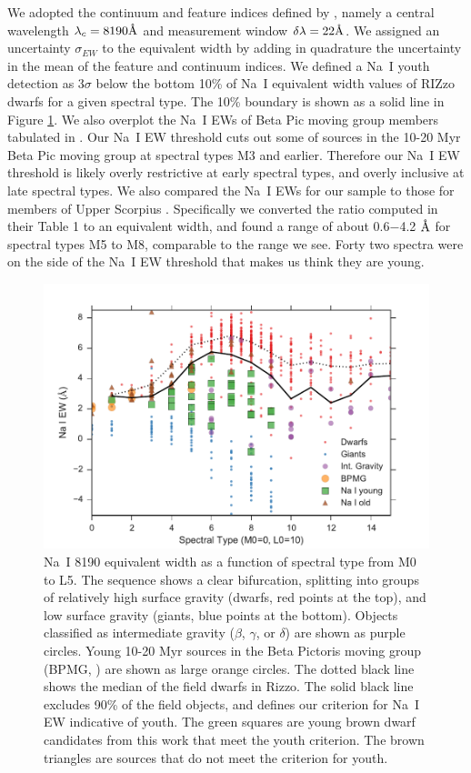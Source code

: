 \documentclass[12pt,preprint]{aastex}
\newcommand{\angstrom}{\mbox{\normalfont\AA}}
\begin{document}
We adopted the continuum and feature indices defined by \citet{2012AJ....143..114S}, namely a central wavelength $\lambda_c= 8190 \angstrom$ and measurement window $\delta \lambda = 22 \angstrom$.  We assigned an uncertainty $\sigma_{EW}$ to the equivalent width by adding in quadrature the uncertainty in the mean of the feature and continuum indices.  We defined a Na~I youth detection as 3$\sigma$ below the bottom 10\% of Na~I equivalent width values of RIZzo dwarfs for a given spectral type.  The 10\% boundary is shown as a solid line in Figure \ref{fig_NaI_EW}.  We also overplot the Na~I EWs of Beta Pic moving group members tabulated in \citet{2012AJ....143..114S}.  Our Na~I EW threshold cuts out some of sources in the 10-20 Myr Beta Pic moving group \citep{2012AJ....143..114S} at spectral types M3 and earlier.  Therefore our Na~I EW threshold is likely overly restrictive at early spectral types, and overly inclusive at late spectral types.  We also compared the Na~I EWs for our sample to those for members of Upper Scorpius \citep{2006AJ....131.3016S}.  Specifically we converted the ratio computed in their Table 1 to an equivalent width, and found a range of about 0.6$-$4.2 $\angstrom$ for spectral types M5 to M8, comparable to the range we see.  Forty two spectra were on the side of the Na~I EW threshold that makes us think they are young.

\begin{figure}[ht!]
  \caption{Na~I 8190 equivalent width as a function of spectral type from M0 to L5.  The sequence shows a clear bifurcation, splitting into groups of relatively high surface gravity (dwarfs, red points at the top), and low surface gravity (giants, blue points at the bottom).  Objects classified as intermediate gravity ($\beta$, $\gamma$, or $\delta$) are shown as purple circles.  Young 10-20 Myr sources in the Beta Pictoris moving group (BPMG, \citet{2012AJ....143..114S}) are shown as large orange circles.  The dotted black line shows the median of the field dwarfs in Rizzo.  The solid black line excludes 90\% of the field objects, and defines our criterion for Na~I EW indicative of youth.  The green squares are young brown dwarf candidates from this work that meet the youth criterion.  The brown triangles are sources that do not meet the criterion for youth.\label{fig_NaI_EW} }
\centering
\includegraphics[scale=0.6]{figures/NaI_EW}
\end{figure}
\end{document}
